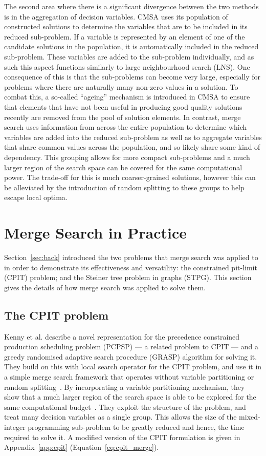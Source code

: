 \documentclass[journal]{IEEEtran}
\begin{document}
The second area where there is a significant divergence between the two methods is in the aggregation of decision variables. CMSA uses its population of constructed solutions to determine the variables that are to be included in its reduced sub-problem. If a variable is represented by an element of one of the candidate solutions in the population, it is automatically included in the reduced sub-problem. These variables are added to the sub-problem individually, and as such this aspect functions similarly to large neighbourhood search (LNS). One consequence of this is that the sub-problems can become very large, especially for problems where there are naturally many non-zero values in a solution. To combat this, a so-called ``ageing'' mechanism is introduced in CMSA to ensure that elements that have not been useful in producing good quality solutions recently are removed from the pool of solution elements. In contrast, merge search uses information from across the entire population to determine which variables are added into the reduced sub-problem as well as to aggregate variables that share common values across the population, and so likely share some kind of dependency. This grouping allows for more compact sub-problems and a much larger region of the search space can be covered for the same computational power. The trade-off for this is much coarser-grained solutions, however this can be alleviated by the introduction of random splitting to these groups to help escape local optima.

\section{Merge Search in Practice}
Section~\ref{sec:back} introduced the two problems that merge search was applied to in order to demonstrate its effectiveness and versatility: the constrained pit-limit (CPIT) problem; and the Steiner tree problem in graphs (STPG). This section gives the details of how merge search was applied to solve them.

\subsection{The CPIT problem}

Kenny et al. \cite{gecco17} describe a novel representation for the precedence constrained production scheduling problem (PCPSP) --- a related problem to CPIT --- and a greedy randomised adaptive search procedure (GRASP) algorithm for solving it. They build on this with local search operator for the CPIT problem, and use it in a simple merge search framework that operates without variable partitioning or random splitting~\cite{gecco18}. By incorporating a variable partitioning mechanism, they show that a much larger region of the search space is able to be explored for the same computational budget~\cite{gecco19}. They exploit the structure of the problem, and treat many decision variables as a single group. This allows the size of the mixed-integer programming sub-problem to be greatly reduced and hence, the time required to solve it. A modified version of the CPIT formulation is given in Appendix~\ref{app:cpit} (Equation~\ref{eq:cpit_merge}).
\end{document}

